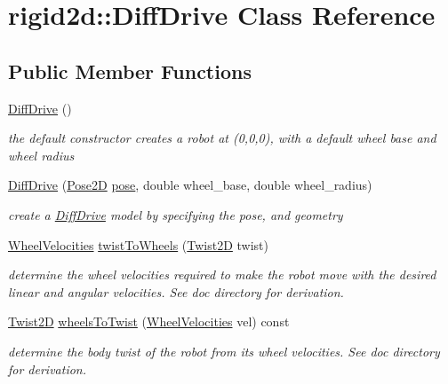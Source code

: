 \hypertarget{classrigid2d_1_1DiffDrive}{}\section{rigid2d\+:\+:Diff\+Drive Class Reference}
\label{classrigid2d_1_1DiffDrive}
\subsection*{Public Member Functions}
\begin{DoxyCompactItemize}
\item 
\mbox{\label{classrigid2d_1_1DiffDrive_a2d646290b7a03d391a59e8a296fea30d}} 
\hyperlink{classrigid2d_1_1DiffDrive_a2d646290b7a03d391a59e8a296fea30d}{Diff\+Drive} ()
\begin{DoxyCompactList}\small\item\em the default constructor creates a robot at (0,0,0), with a default wheel base and wheel radius \end{DoxyCompactList}\item 
\hyperlink{classrigid2d_1_1DiffDrive_a5af54c5b7f4bacebb75a287031e792b4}{Diff\+Drive} (\hyperlink{structrigid2d_1_1Pose2D}{Pose2D} \hyperlink{classrigid2d_1_1DiffDrive_a3af583df8981ddfb338bba07b7297ff2}{pose}, double wheel\+\_\+base, double wheel\+\_\+radius)
\begin{DoxyCompactList}\small\item\em create a \hyperlink{classrigid2d_1_1DiffDrive}{Diff\+Drive} model by specifying the pose, and geometry \end{DoxyCompactList}\item 
\hyperlink{structrigid2d_1_1WheelVelocities}{Wheel\+Velocities} \hyperlink{classrigid2d_1_1DiffDrive_a636194ac11bb3851059989ae118bbf1d}{twist\+To\+Wheels} (\hyperlink{structrigid2d_1_1Twist2D}{Twist2D} twist)
\begin{DoxyCompactList}\small\item\em determine the wheel velocities required to make the robot move with the desired linear and angular velocities. See doc directory for derivation. \end{DoxyCompactList}\item 
\hyperlink{structrigid2d_1_1Twist2D}{Twist2D} \hyperlink{classrigid2d_1_1DiffDrive_a34f3a4df7a14565563a6b56d8eef2b9b}{wheels\+To\+Twist} (\hyperlink{structrigid2d_1_1WheelVelocities}{Wheel\+Velocities} vel) const
\begin{DoxyCompactList}\small\item\em determine the body twist of the robot from its wheel velocities. See doc directory for derivation. \end{DoxyCompactList}\item 

\end{DoxyCompactItemize}
